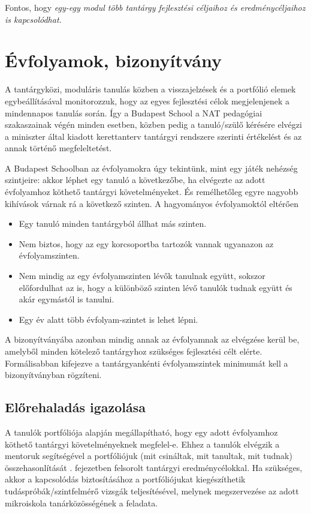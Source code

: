 Fontos, hogy \emph{egy-egy modul több tantárgy fejlesztési céljaihoz és eredménycéljaihoz is kapcsolódhat.}

\section{Évfolyamok, bizonyítvány}
\label{sec:evfolyamok}

A tantárgyközi, moduláris tanulás közben a visszajelzések és a portfólió elemek egybeállításával monitorozzuk, hogy az egyes fejlesztési célok megjelenjenek a mindennapos tanulás során. Így a Budapest School a NAT pedagógiai szakaszainak végén minden esetben, közben pedig a tanuló/szülő kérésére elvégzi a miniszter által kiadott kerettanterv tantárgyi rendszere szerinti értékelést és az annak történő megfeleltetést.

A Budapest Schoolban az évfolyamokra úgy tekintünk, mint egy játék nehézség szintjeire: akkor léphet egy tanuló a következőbe, ha elvégezte az adott évfolyamhoz köthető tantárgyi követelményeket. És remélhetőleg egyre nagyobb kihívások várnak rá a következő szinten. A hagyományos évfolyamoktól eltérően

\begin{itemize}
\item Egy tanuló minden tantárgyból állhat más szinten.
\item Nem biztos, hogy az egy korcsoportba tartozók vannak ugyanazon az évfolyamszinten.
\item Nem mindig az egy évfolyamszinten lévők tanulnak együtt, sokszor előfordulhat az is, hogy a különböző szinten lévő tanulók tudnak együtt és akár egymástól is tanulni.
\item Egy év alatt több évfolyam-szintet is lehet lépni.
\end{itemize}

 A bizonyítványába azonban mindig annak az évfolyamnak az elvégzése kerül be, amelyből minden kötelező tantárgyhoz szükséges fejlesztési célt elérte. Formálisabban kifejezve a tantárgyankénti évfolyamszintek minimumát kell a bizonyítványban rögzíteni.

\subsection{Előrehaladás igazolása}
A tanulók portfóliója alapján megállapítható, hogy egy adott évfolyamhoz köthető tantárgyi követelményeknek megfelel-e. Ehhez a tanulók elvégzik a mentoruk segítségével a portfóliójuk (mit csináltak, mit tanultak, mit tudnak) összehasonlítását  . fejezetben felsorolt tantárgyi eredménycélokkal. Ha szükséges, akkor a kapcsolódás biztosításához a portfóliójukat kiegészíthetik tudáspróbák/szintfelmérő vizsgák teljesítésével, melynek megszervezése az adott mikroiskola tanárközösségének a feladata.

